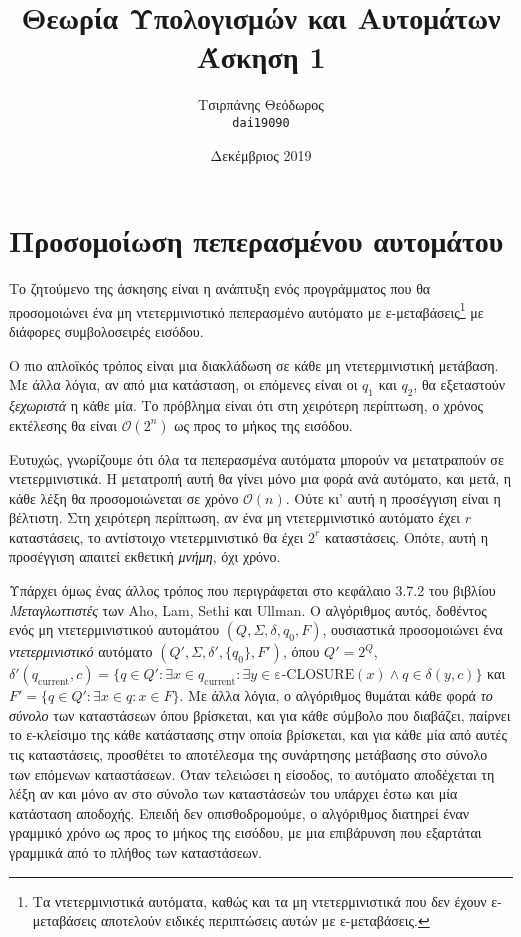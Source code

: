 \documentclass{article}
\title{Θεωρία Υπολογισμών και Αυτομάτων\\ Άσκηση 1}
\author{Τσιρπάνης Θεόδωρος\\ \texttt{dai19090}}
\date{Δεκέμβριος 2019}
\begin{document}

\maketitle

\section{Προσομοίωση πεπερασμένου αυτομάτου}

Το ζητούμενο της άσκησης είναι η ανάπτυξη ενός προγράμματος που θα προσομοιώνει ένα μη ντετερμινιστικό πεπερασμένο αυτόματο με ε-μεταβάσεις\footnote{Τα ντετερμινιστικά αυτόματα, καθώς και τα μη ντετερμινιστικά που δεν έχουν ε-μεταβάσεις αποτελούν ειδικές περιπτώσεις αυτών με ε-μεταβάσεις.} με διάφορες συμβολοσειρές εισόδου.

Ο πιο απλοϊκός τρόπος είναι μια διακλάδωση σε κάθε μη ντετερμινιστική μετάβαση. Με άλλα λόγια, αν από μια κατάσταση, οι επόμενες είναι οι $q_1$ και $q_2$, θα εξεταστούν \emph{ξεχωριστά} η κάθε μία. Το πρόβλημα είναι ότι στη χειρότερη περίπτωση, ο χρόνος εκτέλεσης θα είναι $\mathcal{O}(2^n)$ ως προς το μήκος της εισόδου.

Ευτυχώς, γνωρίζουμε ότι όλα τα πεπερασμένα αυτόματα μπορούν να μετατραπούν σε ντετερμινιστικά. Η μετατροπή αυτή θα γίνει μόνο μια φορά ανά αυτόματο, και μετά, η κάθε λέξη θα προσομοιώνεται σε χρόνο $\mathcal{O}(n)$. Ούτε κι' αυτή η προσέγγιση είναι η βέλτιστη. Στη χειρότερη περίπτωση, αν ένα μη ντετερμινιστικό αυτόματο έχει $r$ καταστάσεις, το αντίστοιχο ντετερμινιστικό θα έχει $2^r$ καταστάσεις. Οπότε, αυτή η προσέγγιση απαιτεί εκθετική \emph{μνήμη}, όχι χρόνο.

Υπάρχει όμως ένας άλλος τρόπος που περιγράφεται στο κεφάλαιο 3.7.2 του βιβλίου \textit{Μεταγλωττιστές} των Aho, Lam, Sethi και Ullman. Ο αλγόριθμος αυτός, δοθέντος ενός μη ντετερμινιστικού αυτομάτου $(Q, \Sigma, \delta, q_0, F)$, ουσιαστικά προσομοιώνει ένα \emph{ντετερμινιστικό} αυτόματο $(Q', \Sigma, \delta', \{q_0\}, F')$, όπου $Q' = 2^Q$, $\delta'(q_\text{current}, c) = \{q \in Q' : \exists x \in q_\text{current} : \exists y \in \text{ε-CLOSURE}(x) \land q \in \delta(y, c)\}$ και $F' = \{q \in Q' : \exists x \in q : x \in F\}$. Με άλλα λόγια, ο αλγόριθμος θυμάται κάθε φορά \emph{το σύνολο} των καταστάσεων όπου βρίσκεται, και για κάθε σύμβολο που διαβάζει, παίρνει το ε-κλείσιμο της κάθε κατάστασης στην οποία βρίσκεται, και για κάθε μία από αυτές τις καταστάσεις, προσθέτει το αποτέλεσμα της συνάρτησης μετάβασης στο σύνολο των επόμενων καταστάσεων. Όταν τελειώσει η είσοδος, το αυτόματο αποδέχεται τη λέξη αν και μόνο αν στο σύνολο των καταστάσεών του υπάρχει έστω και μία κατάσταση αποδοχής. Επειδή δεν οπισθοδρομούμε, ο αλγόριθμος διατηρεί έναν γραμμικό χρόνο ως προς το μήκος της εισόδου, με μια επιβάρυνση που εξαρτάται γραμμικά από το πλήθος των καταστάσεων.
\end{document}
